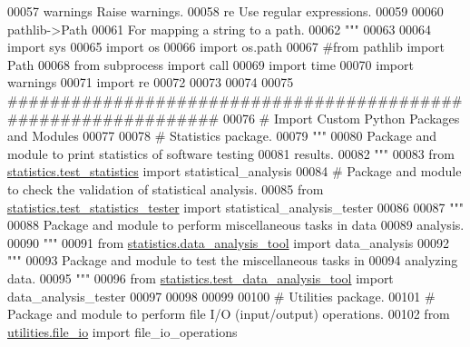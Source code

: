 \begin{DoxyCode}
00057 \textcolor{stringliteral}{    warnings    Raise warnings.}
00058 \textcolor{stringliteral}{    re          Use regular expressions.}
00059 \textcolor{stringliteral}{}
00060 \textcolor{stringliteral}{    pathlib->Path}
00061 \textcolor{stringliteral}{                For mapping a string to a path.}
00062 \textcolor{stringliteral}{"""}
00063 
00064 \textcolor{keyword}{import} sys
00065 \textcolor{keyword}{import} os
00066 \textcolor{keyword}{import} os.path
00067 \textcolor{comment}{#from pathlib import Path}
00068 \textcolor{keyword}{from} subprocess \textcolor{keyword}{import} call
00069 \textcolor{keyword}{import} time
00070 \textcolor{keyword}{import} warnings
00071 \textcolor{keyword}{import} re
00072 
00073 
00074 
00075 \textcolor{comment}{###############################################################}
00076 \textcolor{comment}{#   Import Custom Python Packages and Modules}
00077 
00078 \textcolor{comment}{# Statistics package.}
00079 \textcolor{stringliteral}{"""}
00080 \textcolor{stringliteral}{    Package and module to print statistics of software testing}
00081 \textcolor{stringliteral}{        results.}
00082 \textcolor{stringliteral}{"""}
00083 \textcolor{keyword}{from} \hyperlink{namespacestatistics_1_1test__statistics}{statistics.test\_statistics} \textcolor{keyword}{import} statistical\_analysis
00084 \textcolor{comment}{# Package and module to check the validation of statistical analysis.}
00085 \textcolor{keyword}{from} \hyperlink{namespacestatistics_1_1test__statistics__tester}{statistics.test\_statistics\_tester} \textcolor{keyword}{import} statistical\_analysis\_tester
00086 
00087 \textcolor{stringliteral}{"""}
00088 \textcolor{stringliteral}{    Package and module to perform miscellaneous tasks in data}
00089 \textcolor{stringliteral}{        analysis.}
00090 \textcolor{stringliteral}{"""}
00091 \textcolor{keyword}{from} \hyperlink{namespacestatistics_1_1data__analysis__tool}{statistics.data\_analysis\_tool} \textcolor{keyword}{import} data\_analysis
00092 \textcolor{stringliteral}{"""}
00093 \textcolor{stringliteral}{    Package and module to test the miscellaneous tasks in}
00094 \textcolor{stringliteral}{        analyzing data. }
00095 \textcolor{stringliteral}{"""}
00096 \textcolor{keyword}{from} \hyperlink{namespacestatistics_1_1test__data__analysis__tool}{statistics.test\_data\_analysis\_tool} \textcolor{keyword}{import} data\_analysis\_tester
00097 
00098 
00099 
00100 \textcolor{comment}{# Utilities package.}
00101 \textcolor{comment}{# Package and module to perform file I/O (input/output) operations.}
00102 \textcolor{keyword}{from} \hyperlink{namespaceutilities_1_1file__io}{utilities.file\_io} \textcolor{keyword}{import} file\_io\_operations

\end{DoxyCode}
